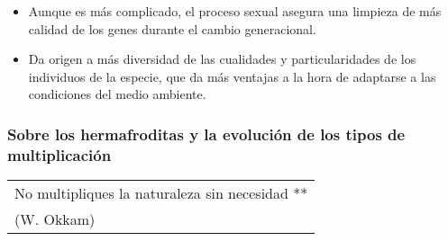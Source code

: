 \begin{itemize}
\tightlist
\item
  Aunque es más complicado, el proceso sexual asegura una limpieza de
  más calidad de los genes durante el cambio generacional.
\item
  Da origen a más diversidad de las cualidades y particularidades de los
  individuos de la especie, que da más ventajas a la hora de adaptarse a
  las condiciones del medio ambiente.
\end{itemize}

\protect\hypertarget{M3}{}{}

\subsubsection{Sobre los hermafroditas y la evolución de los tipos de
multiplicación}\label{sobre-los-hermafroditas-y-la-evoluciuxf3n-de-los-tipos-de-multiplicaciuxf3n}

\begin{longtable}[]{@{}l@{}}
\toprule
No multipliques la naturaleza sin necesidad **\tabularnewline
(W. Okkam)\tabularnewline
\bottomrule
\end{longtable}

